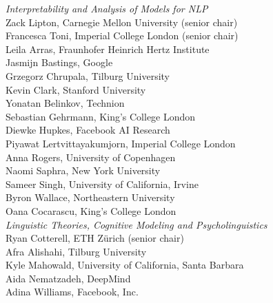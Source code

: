 \emph{Interpretability and Analysis of Models for NLP} \\
\hspace*{0.2in} Zack Lipton, Carnegie Mellon University (senior chair)\\
\hspace*{0.2in} Francesca Toni, Imperial College London (senior chair)\\
\hspace*{0.2in} Leila Arras, Fraunhofer Heinrich Hertz Institute\\
\hspace*{0.2in} Jasmijn Bastings, Google\\
\hspace*{0.2in} Grzegorz Chrupala, Tilburg University\\
\hspace*{0.2in} Kevin Clark, Stanford University\\
\hspace*{0.2in} Yonatan Belinkov, Technion\\
\hspace*{0.2in} Sebastian Gehrmann, King's College London\\
\hspace*{0.2in} Diewke Hupkes, Facebook AI Research\\
\hspace*{0.2in} Piyawat Lertvittayakumjorn, Imperial College London\\
\hspace*{0.2in} Anna Rogers, University of Copenhagen\\
\hspace*{0.2in} Naomi Saphra, New York University\\
\hspace*{0.2in} Sameer Singh, University of California, Irvine\\
\hspace*{0.2in} Byron Wallace, Northeastern University\\
\hspace*{0.2in} Oana Cocarascu, King's College London\\

\emph{Linguistic Theories, Cognitive Modeling and Psycholinguistics} \\
\hspace*{0.2in} Ryan Cotterell, ETH Zürich (senior chair)\\
\hspace*{0.2in} Afra Alishahi, Tilburg University\\
\hspace*{0.2in} Kyle Mahowald, University of California, Santa Barbara\\
\hspace*{0.2in} Aida Nematzadeh, DeepMind\\
\hspace*{0.2in} Adina Williams, Facebook, Inc.\\

